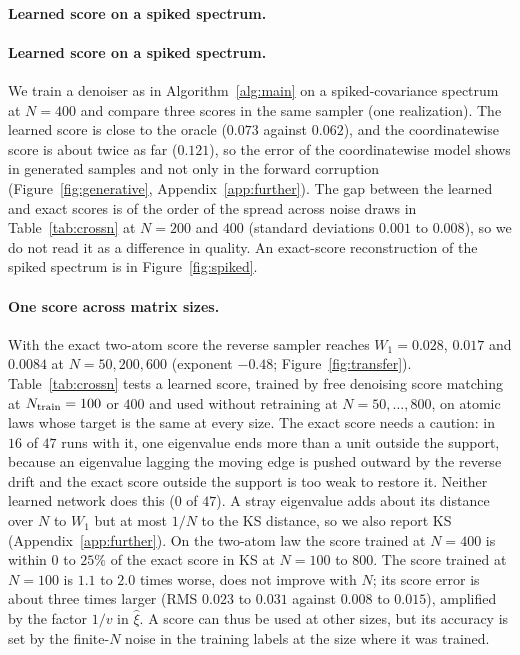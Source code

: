 \documentclass[11pt]{article}
\theoremstyle{plain}
\theoremstyle{definition}
\theoremstyle{remark}
\begin{document}
\paragraph{Learned score on a spiked spectrum.} \paragraph{Learned score on a spiked spectrum.} We train a denoiser as in Algorithm~\ref{alg:main} on a
spiked-covariance spectrum at $N=400$ and compare three scores in the same sampler
(one realization). The learned score is close to the oracle ($0.073$ against
$0.062$), and the coordinatewise score is about twice as far ($0.121$), so the error of the coordinatewise
model shows in generated samples and not only in the forward corruption (Figure~\ref{fig:generative},
Appendix~\ref{app:further}). The gap between the learned and exact scores is of the order of the spread across
noise draws in Table~\ref{tab:crossn} at $N=200$ and $400$ (standard deviations $0.001$ to $0.008$), so we do not
read it as a difference in quality. An exact-score reconstruction of the spiked spectrum is in
Figure~\ref{fig:spiked}.

\paragraph{One score across matrix sizes.} With the exact two-atom score the reverse sampler reaches $W_1=0.028$, $0.017$ and $0.0084$
at $N=50,200,600$ (exponent $-0.48$; Figure~\ref{fig:transfer}). Table~\ref{tab:crossn} tests a learned score, trained by free denoising score matching at
$N_{\rm train}=100$ or $400$ and used without retraining at $N=50,\dots,800$, on atomic laws whose target is the same at every size. The exact score
needs a caution: in $16$ of $47$ runs with it, one eigenvalue ends more than a unit outside the support, because an eigenvalue lagging the moving edge is
pushed outward by the reverse drift and the exact score outside the support is too weak to restore it. Neither learned network does this ($0$ of $47$).
A stray eigenvalue adds about its distance over $N$ to $W_1$ but at most $1/N$ to the KS distance, so we also report KS (Appendix~\ref{app:further}).
On the two-atom law the score trained at $N=400$ is within $0$ to $25\%$ of the exact score in KS at $N=100$ to $800$. The score trained at $N=100$ is
$1.1$ to $2.0$ times worse, does not improve with $N$; its score error is about three times larger
(RMS $0.023$ to $0.031$ against $0.008$ to $0.015$), amplified by the factor $1/v$ in $\widehat\xi$.
A score can thus be used at other sizes, but its accuracy is set by the finite-$N$ noise in the training labels at the size where it was trained.
\end{document}
